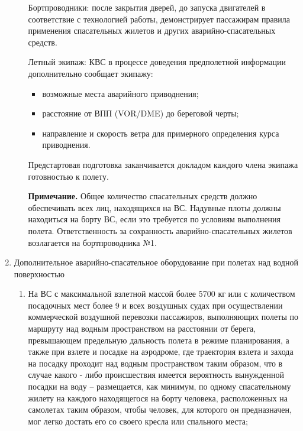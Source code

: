 \begin{enumerate}
\begin{enumerate}
        Бортпроводники: после закрытия дверей, до запуска двигателей в соответствие с технологией работы, демонстрирует пассажирам правила применения спасательных жилетов и других аварийно-спасательных средств.

        Летный экипаж: 
        КВС в процессе доведения предполетной информации дополнительно сообщает экипажу:
        \begin{itemize}
            \item возможные места аварийного приводнения;
            \item расстояние от ВПП (VOR/DME) до береговой черты;
            \item направление и скорость ветра для примерного определения курса приводнения.
        \end{itemize}

        Предстартовая подготовка заканчивается докладом каждого члена экипажа готовностью к полету.

        \textbf{Примечание.} Общее количество спасательных средств должно обеспечивать всех лиц, находящихся на ВС. Надувные плоты должны находиться на борту ВС, если это требуется по условиям выполнения полета. Ответственность за сохранность аварийно-спасательных жилетов возлагается на бортпроводника №1. 
    \end{enumerate}
    \item Дополнительное аварийно-спасательное оборудование при полетах над водной                                         поверхностью
    \begin{enumerate}
        \item \label{sec:oneeng} На ВС  с максимальной взлетной массой более 5700 кг или с количеством посадочных мест более 9 и всех воздушных судах при осуществлении коммерческой воздушной перевозки пассажиров, выполняющих полеты по маршруту над водным пространством на расстоянии от берега, превышающем предельную дальность полета в режиме планирования, а также при взлете и посадке на аэродроме, где траектория взлета и захода на посадку проходит над водным пространством таким образом, что в случае какого - либо происшествия имеется вероятность вынужденной посадки на воду – размещается, как минимум, по одному спасательному жилету на каждого находящегося на борту человека, расположенных на самолетах таким образом, чтобы человек, для которого он предназначен, мог легко достать его со своего кресла или спального места;
        

\end{enumerate}
\end{enumerate}
